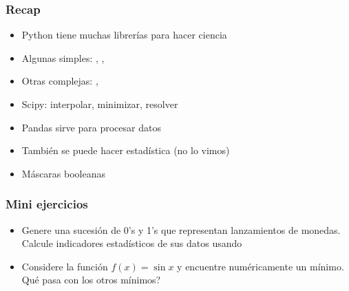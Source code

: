 \documentclass[14pt,aspectratio=169,xcolor=dvipsnames]{beamer}
\begin{document}
\begin{frame}\frametitle{Recap}
    \begin{itemize}
        \item Python tiene muchas librerías para hacer ciencia
        \item Algunas simples: , , 
        \item Otras complejas: , 
        \item Scipy: interpolar, minimizar, resolver
        \item Pandas sirve para procesar datos
        \item También se puede hacer estadística (no lo vimos)
        \item Máscaras booleanas
    \end{itemize}

    \pause
    \vspace{1cm}
\end{frame}
\begin{frame}
    \maketitle
\end{frame}
\begin{frame}\frametitle{Mini ejercicios}
    \begin{itemize}
        \item Genere una sucesión de 0's y 1's que representan lanzamientos de monedas. Calcule indicadores estadísticos de sus datos usando 
        \item Considere la función $f(x)=\sin x$ y encuentre numéricamente un mínimo. Qué pasa con los otros mínimos? 
    \end{itemize}
\end{frame}
\end{document}
